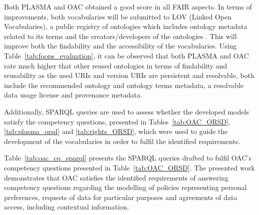 Both PLASMA and OAC obtained a good score in all FAIR aspects.
In terms of improvements, both vocabularies will be submitted to LOV (Linked Open Vocabularies), a public registry of ontologies which includes ontology metadata related to its terms and the creators/developers of the ontologies \citep{dumontier_linked_2017}.
This will improve both the findability and the accessibility of the vocabularies.
Using Table~\ref{tab:foops_evaluation}, it can be observed that both PLASMA and OAC rate much higher that other reused ontologies in terms of findability and reusability as the used URIs and version URIs are persistent and resolvable, both include the recommended ontology and ontology terms metadata, a resolvable data usage license and provenance metadata.

Additionally, SPARQL queries are used to assess whether the developed models satisfy the competency questions, presented in Tables~\ref{tab:OAC_ORSD}, \ref{tab:plasma_orsd} and \ref{tab:rights_ORSD}, which were used to guide the development of the vocabularies in order to fulfil the identified requirements.

Table~\ref{tab:oac_cq_sparql} presents the SPARQL queries drafted to fulfil OAC's competency questions presented in Table~\ref{tab:OAC_ORSD}.
The presented work demonstrates that OAC satisfies the identified requirements of answering competency questions regarding the modelling of policies representing personal preferences, requests of data for particular purposes and agreements of data access, including contextual information.

